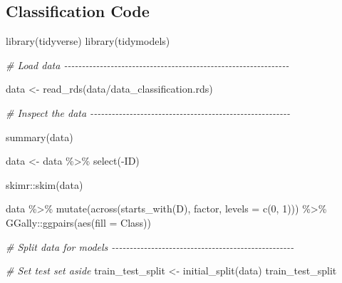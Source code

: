 \documentclass[
]{book}
\newenvironment{Shaded}{\begin{snugshade}}{\end{snugshade}}
\newcommand{\AttributeTok}[1]{\textcolor[rgb]{0.77,0.63,0.00}{#1}}
\newcommand{\CommentTok}[1]{\textcolor[rgb]{0.56,0.35,0.01}{\textit{#1}}}
\newcommand{\DecValTok}[1]{\textcolor[rgb]{0.00,0.00,0.81}{#1}}
\newcommand{\FunctionTok}[1]{\textcolor[rgb]{0.00,0.00,0.00}{#1}}
\newcommand{\NormalTok}[1]{#1}
\newcommand{\OtherTok}[1]{\textcolor[rgb]{0.56,0.35,0.01}{#1}}
\newcommand{\SpecialCharTok}[1]{\textcolor[rgb]{0.00,0.00,0.00}{#1}}
\newcommand{\StringTok}[1]{\textcolor[rgb]{0.31,0.60,0.02}{#1}}
\begin{document}
\hypertarget{classification-code}{%
\subsection{Classification Code}\label{classification-code}}

\begin{Shaded}
\begin{Highlighting}[]
\FunctionTok{library}\NormalTok{(tidyverse)}
\FunctionTok{library}\NormalTok{(tidymodels)}


\CommentTok{\# Load data {-}{-}{-}{-}{-}{-}{-}{-}{-}{-}{-}{-}{-}{-}{-}{-}{-}{-}{-}{-}{-}{-}{-}{-}{-}{-}{-}{-}{-}{-}{-}{-}{-}{-}{-}{-}{-}{-}{-}{-}{-}{-}{-}{-}{-}{-}{-}{-}{-}{-}{-}{-}{-}{-}{-}{-}{-}{-}{-}{-}{-}{-}{-}}

\NormalTok{data }\OtherTok{\textless{}{-}} \FunctionTok{read\_rds}\NormalTok{(}\StringTok{\textquotesingle{}data/data\_classification.rds\textquotesingle{}}\NormalTok{)}

\CommentTok{\# Inspect the data {-}{-}{-}{-}{-}{-}{-}{-}{-}{-}{-}{-}{-}{-}{-}{-}{-}{-}{-}{-}{-}{-}{-}{-}{-}{-}{-}{-}{-}{-}{-}{-}{-}{-}{-}{-}{-}{-}{-}{-}{-}{-}{-}{-}{-}{-}{-}{-}{-}{-}{-}{-}{-}{-}{-}{-}}

\FunctionTok{summary}\NormalTok{(data)}

\NormalTok{data }\OtherTok{\textless{}{-}}\NormalTok{ data }\SpecialCharTok{\%\textgreater{}\%} \FunctionTok{select}\NormalTok{(}\SpecialCharTok{{-}}\NormalTok{ID)}

\NormalTok{skimr}\SpecialCharTok{::}\FunctionTok{skim}\NormalTok{(data)}

\NormalTok{data }\SpecialCharTok{\%\textgreater{}\%}
  \FunctionTok{mutate}\NormalTok{(}\FunctionTok{across}\NormalTok{(}\FunctionTok{starts\_with}\NormalTok{(}\StringTok{\textquotesingle{}D\textquotesingle{}}\NormalTok{), factor, }\AttributeTok{levels =} \FunctionTok{c}\NormalTok{(}\DecValTok{0}\NormalTok{, }\DecValTok{1}\NormalTok{))) }\SpecialCharTok{\%\textgreater{}\%}
\NormalTok{  GGally}\SpecialCharTok{::}\FunctionTok{ggpairs}\NormalTok{(}\FunctionTok{aes}\NormalTok{(}\AttributeTok{fill =}\NormalTok{ Class))}



\CommentTok{\# Split data for models {-}{-}{-}{-}{-}{-}{-}{-}{-}{-}{-}{-}{-}{-}{-}{-}{-}{-}{-}{-}{-}{-}{-}{-}{-}{-}{-}{-}{-}{-}{-}{-}{-}{-}{-}{-}{-}{-}{-}{-}{-}{-}{-}{-}{-}{-}{-}{-}{-}{-}{-}}

\CommentTok{\# Set test set aside}
\NormalTok{train\_test\_split }\OtherTok{\textless{}{-}} \FunctionTok{initial\_split}\NormalTok{(data)}
\NormalTok{train\_test\_split}


\end{Highlighting}
\end{Shaded}
\end{document}
